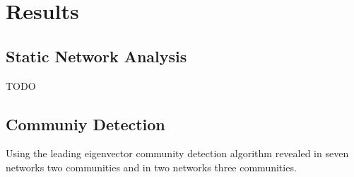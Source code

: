 \chapter{Results}



\section{Static Network Analysis}
TODO

\section{Communiy Detection}

Using the leading eigenvector community detection algorithm revealed in seven  networks two  communities and in two networks three communities.

